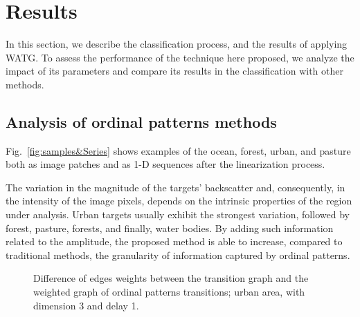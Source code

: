 \documentclass[journal]{IEEEtran}
\begin{document}
\section{Results}\label{Results}

In this section, we describe  the classification process, and 
the results of applying WATG.
To assess the performance of the technique here proposed, we analyze the impact of its parameters and compare its results in the classification with other methods.

\subsection{Analysis of ordinal patterns methods}

Fig.~\ref{fig:samples&Series} shows examples of the ocean, forest, urban, and pasture both as image patches and as 1-D sequences after the linearization process.

The variation in the magnitude of the targets' backscatter and, consequently, in the intensity of the image pixels, depends on the intrinsic properties of the region under analysis.
Urban targets usually exhibit the strongest variation, followed by forest, pasture, forests, and finally, water bodies.
By adding such information related to the amplitude, the proposed method is able to increase, compared to traditional methods, the granularity of information captured by ordinal patterns.

\begin{figure}%
	\centering
	\caption{Difference of edges weights between the transition graph and the weighted graph of ordinal patterns transitions; urban area, with dimension 3 and delay 1.}
	\label{fig:graphs}
\end{figure}
\end{document}
